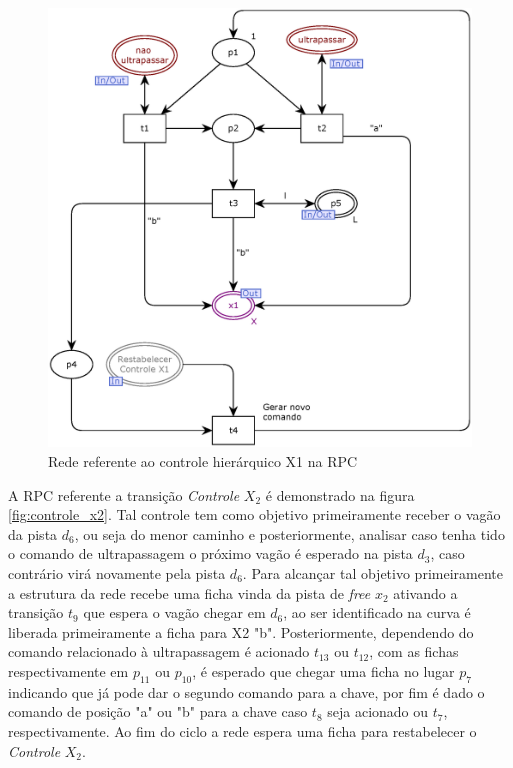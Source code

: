 \begin{figure}[ht]
    \centering
    \caption{Rede referente ao controle hierárquico X1 na RPC}
    \label{fig:controle_x1}
    \includegraphics[width=0.5\linewidth]{figures//Simulation//Modelagem/controle_x1.eps}
\end{figure}

A RPC referente a transição \textit{Controle} $X_2$ é demonstrado na figura \ref{fig:controle_x2}. Tal controle tem como objetivo primeiramente receber o vagão da pista $d_6$, ou seja do menor caminho e posteriormente, analisar caso tenha tido o comando de ultrapassagem o próximo vagão é esperado na pista $d_3$, caso contrário virá novamente pela pista $d_6$. Para alcançar tal objetivo primeiramente a estrutura da rede recebe uma ficha vinda da pista de \textit{free} $x_2$ ativando a transição $t_9$ que espera o vagão chegar em $d_6$, ao ser identificado na curva é liberada primeiramente a ficha para X2 "b". Posteriormente, dependendo do comando relacionado à ultrapassagem é acionado $t_13$ ou $t_12$, com as fichas respectivamente em $p_11$ ou $p_10$, é esperado que chegar uma ficha no lugar $p_7$ indicando que já pode dar o segundo comando para a chave, por fim é dado o comando de posição "a" ou "b" para a chave caso $t_8$ seja acionado ou $t_7$, respectivamente. Ao fim do ciclo a rede espera uma ficha para restabelecer o \textit{Controle} $X_2$.

